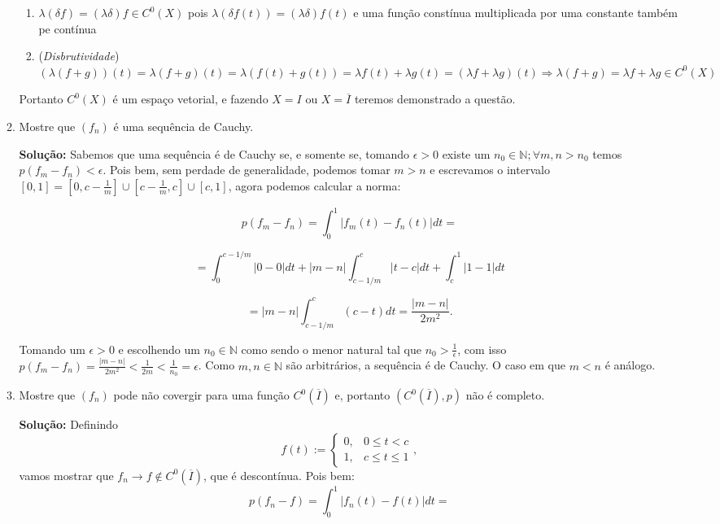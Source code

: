 \documentclass{article}
\begin{document}
\begin{enumerate}
\begin{enumerate}
\begin{enumerate}
				\item $\lambda(\delta f) = (\lambda\delta) f \in C^{0}(X)$ pois $\lambda(\delta f(t)) = (\lambda\delta)f(t)$ e uma função constínua multiplicada por uma constante também pe contínua
				
				\item (\textit{Disbrutividade}) $(\lambda(f+g))(t) = \lambda (f + g)(t) =  \lambda (f(t) + g(t)) = \lambda f(t) + \lambda g(t) = (\lambda f + \lambda g)(t)   \Rightarrow \lambda(f+g) = \lambda f+ \lambda g \in C^{0}(X)$
			\end{enumerate}
			Portanto $C^0(X)$ é um espaço vetorial, e fazendo $X=I$ ou $X=\overline{I}$ teremos demonstrado a questão. 
			
			\item Mostre que $(f_n)$ é uma sequência de Cauchy.
			
			\textbf{Solução:} Sabemos que uma sequência é de Cauchy se, e somente se, tomando $\epsilon >0$ existe um $n_0 \in \mathbb{N}; \forall m, n>n_0$ temos $p(f_m - f_n)<\epsilon$. Pois bem, sem perdade de generalidade, podemos tomar $m>n$ e escrevamos o intervalo $[0,1] = [0,c-\frac{1}{m}] \cup [c-\frac{1}{m}, c] \cup [c, 1]$, agora podemos calcular a norma:
			
			$$
			p(f_m - f_n) = \int_{0}^{1} |f_m(t) - f_n(t)| dt =  
			$$
			
			$$
			=\int_{0}^{c-1/m} |0 - 0| dt + |m-n|\int_{c-1/m}^{c}|t-c|dt + \int_{c}^{1} |1 - 1| dt 
			$$ 
			
			$$
			=|m-n|\int_{c-1/m}^{c}(c-t)dt = \frac{|m-n|}{2m^2}.
			$$
			
			Tomando um $\epsilon >0$  e escolhendo um $n_0 \in \mathbb{N}$ como sendo o menor natural tal que $n_0 > \frac{1}{\epsilon}$, com isso $p(f_m - f_n) = \frac{|m-n|}{2m^2} < \frac{1}{2m}< \frac{1}{n_0} = \epsilon$. Como $m,n \in \mathbb{N}$ são arbitrários, a sequência é de Cauchy. O caso em que $m < n$ é análogo.
			
			\item Mostre que $(f_n)$ pode não covergir para uma função $C^{0}(\overline{I})$ e, portanto $(C^{0}(\overline{I}), p)$ não é completo.
			
			\textbf{Solução:} Definindo 
			$$
			f(t) := \left\{
			\begin{array}{cc}
			0, & 0 \leq t < c  \\
			1, & c \leq t \leq 1
			\end{array}
			\right.,
			$$
			vamos mostrar que $f_n \to f \notin C^{0}(\overline{I})$, que é descontínua. Pois bem:
			$$
			p(f_n - f) = \int_{0}^{1} |f_n(t) - f(t)| dt = 
			$$
			

\end{enumerate}
\end{enumerate}
\end{document}
